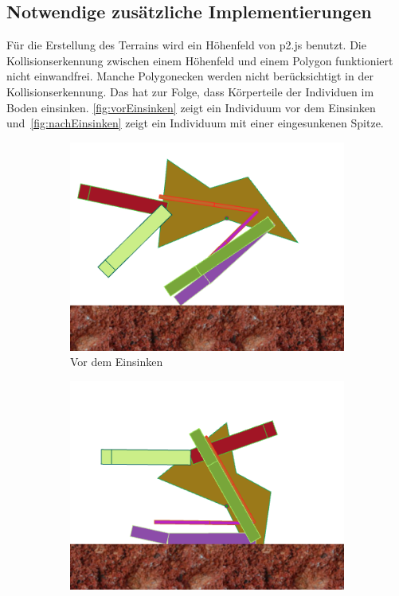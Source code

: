       \subsection{Notwendige zusätzliche Implementierungen}

        Für die Erstellung des Terrains wird ein Höhenfeld von p2.js benutzt.
        Die Kollisionserkennung zwischen einem Höhenfeld und einem Polygon funktioniert nicht einwandfrei.
        Manche Polygonecken werden nicht berücksichtigt in der Kollisionserkennung.
        Das hat zur Folge, dass Körperteile der Individuen im Boden einsinken.
        \vref{fig:vorEinsinken} zeigt ein Individuum vor dem Einsinken
        und~\vref{fig:nachEinsinken} zeigt ein Individuum mit einer eingesunkenen Spitze.

        \begin{figure}[H]
          \centering
          \begin{subfigure}[b]{0.45\textwidth}
            \includegraphics[width=\linewidth,center]{graphics/physics-engine/sink-0}
            \caption{Vor dem Einsinken\label{fig:vorEinsinken}}
          \end{subfigure}
          \qquad
          \begin{subfigure}[b]{0.45\textwidth}
            \includegraphics[width=\linewidth,center]{graphics/physics-engine/sink-1}

\end{subfigure}
\end{figure}

